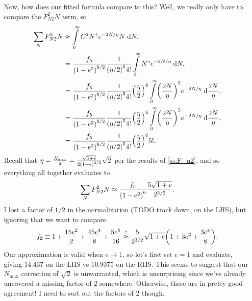 \documentclass[11pt,
        usenames, %
        dvipsnames %
    ]{article}
\DeclarePairedDelimiter\p{\lparen}{\rparen}
\begin{document}
Now, how does our fitted formula compare to this? Well, we really only have to
compare the $F_{N2}^2N$ term, so
\begin{align}
    \sum\limits_{N}F_{N2}^2N &\approx \int\limits_0^\infty
            C^2 N^4 e^{-2N/\eta}N\;\mathrm{d}N,\\
        &= \frac{f_5}{\p*{1 - e^2}^{9/2}}
                \frac{1}{\p*{\eta / 2}^5 4!}
            \int\limits_0^\infty N^5 e^{-2N/\eta}\;\mathrm{d}N,\\
        &= \frac{f_5}{\p*{1 - e^2}^{9/2}}
                \frac{1}{\p*{\eta / 2}^5 4!}
            \p*{\frac{\eta}{2}}^6
            \int\limits_0^\infty \p*{\frac{2N}{\eta}}^5
                e^{-2N/\eta}\;\mathrm{d}\frac{2N}{\eta},\\
        &= \frac{f_5}{\p*{1 - e^2}^{9/2}}
                \frac{1}{\p*{\eta / 2}^5 4!}
            \p*{\frac{\eta}{2}}^6
            \int\limits_0^\infty \p*{\frac{2N}{\eta}}^5
                e^{-2N/\eta}\;\mathrm{d}\frac{2N}{\eta},\\
        &= \frac{f_5}{\p*{1 - e^2}^{9/2}}
                \frac{1}{\p*{\eta / 2}^5 4!}
            \p*{\frac{\eta}{2}}^6 5!.
\end{align}
Recall that $\eta = \frac{N_{\max}}{2} = \frac{\sqrt{1 + e}}{2\p*{1 -
e}^{3/2}}\sqrt{2}$ per the results of \autoref{ss:F_n2}, and so everything all
together evaluates to
\begin{equation}
    \sum\limits_{N}F_{N2}^2N \approx \frac{f_5}{\p*{1 - e^2}^{6}}
        \frac{5\sqrt{1 + e}}{2^{3/2}}.
\end{equation}
I lost a factor of $1/2$ in the normalization (TODO track down, on the LHS), but
ignoring that we want to compare
\begin{equation}
    f_2 \equiv 1 + \frac{15 e^2}{2} + \frac{45e^4}{8} + \frac{5e^6}{16}
        \overset{?}{\approx} \frac{5}{2^{3/2}}\sqrt{1 + e}
            \p*{1 + 3e^2 + \frac{3e^4}{8}}.
\end{equation}
Our approximation is valid when $e \to 1$, so let's first set $e = 1$ and
evaluate, giving $14.437$ on the LHS vs $10.9375$ on the RHS\@. This seems to
suggest that our $N_{\max}$ correction of $\sqrt{2}$ is unwarranted, which is
unsurprising since we've already uncovered a missing factor of $2$ somewhere.
Otherwise, these are in pretty good agreement! I need to sort out the factors of
$2$ though.
\end{document}
